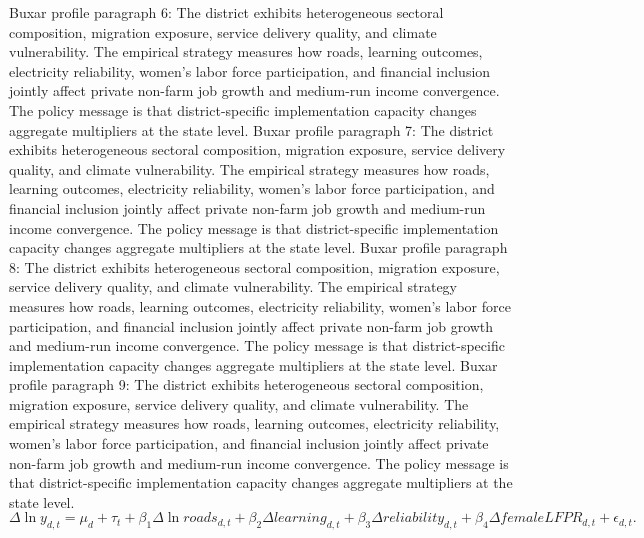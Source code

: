 \documentclass[preprint,12pt]{elsarticle}
\begin{document}
Buxar profile paragraph 6: The district exhibits heterogeneous sectoral composition, migration exposure, service delivery quality, and climate vulnerability. The empirical strategy measures how roads, learning outcomes, electricity reliability, women's labor force participation, and financial inclusion jointly affect private non-farm job growth and medium-run income convergence. The policy message is that district-specific implementation capacity changes aggregate multipliers at the state level.
Buxar profile paragraph 7: The district exhibits heterogeneous sectoral composition, migration exposure, service delivery quality, and climate vulnerability. The empirical strategy measures how roads, learning outcomes, electricity reliability, women's labor force participation, and financial inclusion jointly affect private non-farm job growth and medium-run income convergence. The policy message is that district-specific implementation capacity changes aggregate multipliers at the state level.
Buxar profile paragraph 8: The district exhibits heterogeneous sectoral composition, migration exposure, service delivery quality, and climate vulnerability. The empirical strategy measures how roads, learning outcomes, electricity reliability, women's labor force participation, and financial inclusion jointly affect private non-farm job growth and medium-run income convergence. The policy message is that district-specific implementation capacity changes aggregate multipliers at the state level.
Buxar profile paragraph 9: The district exhibits heterogeneous sectoral composition, migration exposure, service delivery quality, and climate vulnerability. The empirical strategy measures how roads, learning outcomes, electricity reliability, women's labor force participation, and financial inclusion jointly affect private non-farm job growth and medium-run income convergence. The policy message is that district-specific implementation capacity changes aggregate multipliers at the state level.
\begin{equation}\Delta \ln y_{d,t}=\mu_d+\tau_t+\beta_1\Delta\ln roads_{d,t}+\beta_2\Delta learning_{d,t}+\beta_3\Delta reliability_{d,t}+\beta_4\Delta femaleLFPR_{d,t}+\epsilon_{d,t}.\end{equation}
\end{document}
